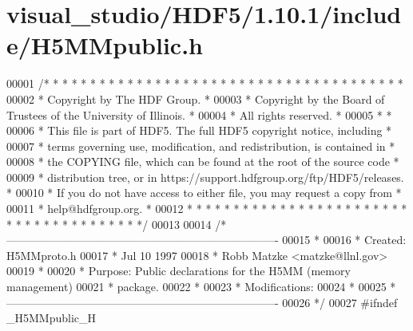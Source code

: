 \hypertarget{visual__studio_2_h_d_f5_21_810_81_2include_2_h5_m_mpublic_8h_source}{}\section{visual\+\_\+studio/\+H\+D\+F5/1.10.1/include/\+H5\+M\+Mpublic.h}
\label{visual__studio_2_h_d_f5_21_810_81_2include_2_h5_m_mpublic_8h_source}

\begin{DoxyCode}
00001 \textcolor{comment}{/* * * * * * * * * * * * * * * * * * * * * * * * * * * * * * * * * * * * * * *}
00002 \textcolor{comment}{ * Copyright by The HDF Group.                                               *}
00003 \textcolor{comment}{ * Copyright by the Board of Trustees of the University of Illinois.         *}
00004 \textcolor{comment}{ * All rights reserved.                                                      *}
00005 \textcolor{comment}{ *                                                                           *}
00006 \textcolor{comment}{ * This file is part of HDF5.  The full HDF5 copyright notice, including     *}
00007 \textcolor{comment}{ * terms governing use, modification, and redistribution, is contained in    *}
00008 \textcolor{comment}{ * the COPYING file, which can be found at the root of the source code       *}
00009 \textcolor{comment}{ * distribution tree, or in https://support.hdfgroup.org/ftp/HDF5/releases.  *}
00010 \textcolor{comment}{ * If you do not have access to either file, you may request a copy from     *}
00011 \textcolor{comment}{ * help@hdfgroup.org.                                                        *}
00012 \textcolor{comment}{ * * * * * * * * * * * * * * * * * * * * * * * * * * * * * * * * * * * * * * */}
00013 
00014 \textcolor{comment}{/*-------------------------------------------------------------------------}
00015 \textcolor{comment}{ *}
00016 \textcolor{comment}{ * Created:             H5MMproto.h}
00017 \textcolor{comment}{ *                      Jul 10 1997}
00018 \textcolor{comment}{ *                      Robb Matzke <matzke@llnl.gov>}
00019 \textcolor{comment}{ *}
00020 \textcolor{comment}{ * Purpose:             Public declarations for the H5MM (memory management)}
00021 \textcolor{comment}{ *                      package.}
00022 \textcolor{comment}{ *}
00023 \textcolor{comment}{ * Modifications:}
00024 \textcolor{comment}{ *}
00025 \textcolor{comment}{ *-------------------------------------------------------------------------}
00026 \textcolor{comment}{ */}
00027 \textcolor{preprocessor}{#ifndef \_H5MMpublic\_H}

\end{DoxyCode}
